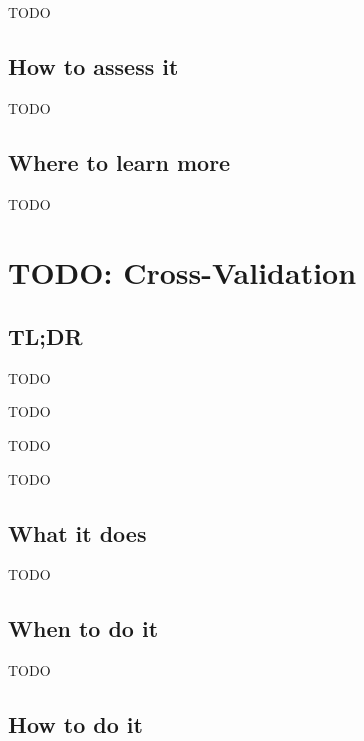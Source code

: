 \documentclass[
]{book}
\providecommand{\tightlist}{%
  \setlength{\itemsep}{0pt}\setlength{\parskip}{0pt}}
\begin{document}
TODO

\hypertarget{how-to-assess-it-7}{%
\section{How to assess it}\label{how-to-assess-it-7}}

TODO

\hypertarget{where-to-learn-more-7}{%
\section{Where to learn more}\label{where-to-learn-more-7}}

TODO

\hypertarget{cross-validation}{%
\chapter{TODO: Cross-Validation}\label{cross-validation}}

\hypertarget{tldr-8}{%
\section{TL;DR}\label{tldr-8}}

\begin{description}
\tightlist
\item[What it does]
TODO
\item[When to do it]
TODO
\item[How to do it]
TODO
\item[How to assess it]
TODO
\end{description}

\hypertarget{what-it-does-8}{%
\section{What it does}\label{what-it-does-8}}

TODO

\hypertarget{when-to-do-it-8}{%
\section{When to do it}\label{when-to-do-it-8}}

TODO

\hypertarget{how-to-do-it-8}{%
\section{How to do it}\label{how-to-do-it-8}}
\end{document}
